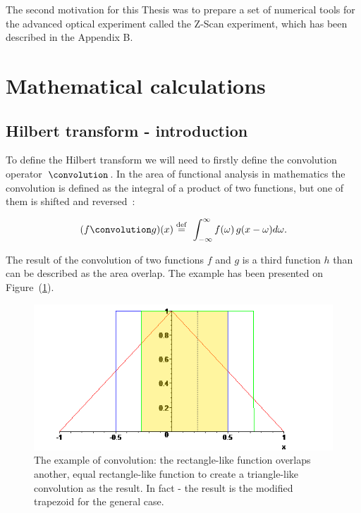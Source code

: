 \documentclass[12pt,twoside,a4paper]{article}
\numberwithin{equation}{subsection}
\numberwithin{figure}{subsection}
\begin{document}
The second motivation for this Thesis was to prepare a set of numerical tools for the advanced optical experiment called the
Z-Scan experiment, which has been described in the Appendix B.

\section{Mathematical calculations} \label{chap:mathematical_calculations}

\subsection{Hilbert transform - introduction}  \label{chap:mathematical_hilbert}

To define the Hilbert transform we will need to firstly define the convolution operator~$\convolution$. In the area of functional analysis
in mathematics the convolution is defined as the integral of a product of two functions, but one of them is shifted and
reversed~\cite{bracewell_fourier}:

\begin{equation} \label{eh:mth_convolution}
	(f \convolution g)(x) \stackrel{\mathrm{def}}{=}\  \int_{-\infty }^{\infty } f(\omega) \, g(x - \omega) d\omega .
\end{equation}
 
The result of the convolution of two functions $f$ and $g$ is a third function $h$ than can be described as the area overlap. The example
has been presented on Figure~(\ref{fig:mathematical_convolution}).

\begin{figure} 
	\begin{center}
		\includegraphics{img/convolution.png}
		\caption{The example of convolution: the rectangle-like function overlaps another, equal rectangle-like function to create a
		triangle-like convolution as the result. In fact - the result is the modified trapezoid for the general case.
		\label{fig:mathematical_convolution}}
	\end{center}
\end{figure}  
\end{document}
